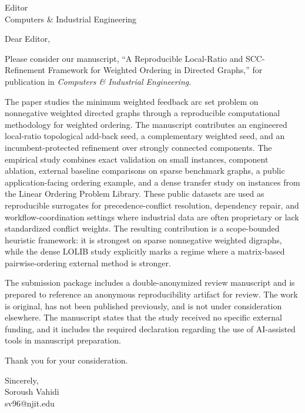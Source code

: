 \documentclass[12pt]{letter}
\begin{document}
\begin{letter}{Editor\\Computers \& Industrial Engineering}

\opening{Dear Editor,}

Please consider our manuscript, ``A Reproducible Local-Ratio and SCC-Refinement Framework for Weighted Ordering in Directed Graphs,'' for publication in \textit{Computers \& Industrial Engineering}.

The paper studies the minimum weighted feedback arc set problem on nonnegative weighted directed graphs through a reproducible computational methodology for weighted ordering. The manuscript contributes an engineered local-ratio topological add-back seed, a complementary weighted seed, and an incumbent-protected refinement over strongly connected components. The empirical study combines exact validation on small instances, component ablation, external baseline comparisons on sparse benchmark graphs, a public application-facing ordering example, and a dense transfer study on instances from the Linear Ordering Problem Library. These public datasets are used as reproducible surrogates for precedence-conflict resolution, dependency repair, and workflow-coordination settings where industrial data are often proprietary or lack standardized conflict weights. The resulting contribution is a scope-bounded heuristic framework: it is strongest on sparse nonnegative weighted digraphs, while the dense LOLIB study explicitly marks a regime where a matrix-based pairwise-ordering external method is stronger.

The submission package includes a double-anonymized review manuscript and is prepared to reference an anonymous reproducibility artifact for review. The work is original, has not been published previously, and is not under consideration elsewhere. The manuscript states that the study received no specific external funding, and it includes the required declaration regarding the use of AI-assisted tools in manuscript preparation.

Thank you for your consideration.

\closing{Sincerely,\\[1.5ex]Soroush Vahidi\\\mbox{sv96@njit.edu}}

\end{letter}
\end{document}
